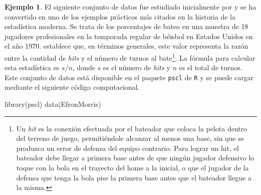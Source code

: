 \documentclass[
  10pt,
  spanish,
]{book}
\newenvironment{Shaded}{\begin{snugshade}}{\end{snugshade}}
\newcommand{\FunctionTok}[1]{\textcolor[rgb]{0.00,0.00,0.00}{#1}}
\newcommand{\NormalTok}[1]{#1}
\theoremstyle{definition}
\theoremstyle{definition}
\newtheorem{example}{Ejemplo}[chapter]
\theoremstyle{definition}
\theoremstyle{definition}
\theoremstyle{remark}
\begin{document}
\begin{example}
\protect\hypertarget{exm:unnamed-chunk-23}{}{\label{exm:unnamed-chunk-23} }El siguiente conjunto de datos fue estudiado inicialmente por \citet{Efron75} y se ha convertido en uno de los ejemplos prácticos más citados en la historia de la estadística moderna. Se trata de los porcentajes de bateo en una muestra de 18 jugadores profesionales en la temporada regular de béisbol en Estados Unidos en el año 1970. \citet{wikiBat} establece que, en términos generales, este valor representa la razón entre la cantidad de \emph{hits} y el número de turnos al bate\footnote{Un \emph{hit} es la conexión efectuada por el bateador que coloca la pelota dentro del terreno de juego, permitiéndole alcanzar al menos una base, sin que se produzca un error de defensa del equipo contrario. Para lograr un hit, el bateador debe llegar a primera base antes de que ningún jugador defensivo lo toque con la bola en el trayecto del home a la inicial, o que el jugador de la defensa que tenga la bola pise la primera base antes que el bateador llegue a la misma.}. La fórmula para calcular esta estadística es \(s/n\), donde \(s\) es el número de \emph{hits} y \(n\) es el total de turnos. Este conjunto de datos está disponible en el paquete \texttt{pscl} de \texttt{R} y se puede cargar mediante el siguiente código computacional.
\end{example}

\begin{Shaded}
\begin{Highlighting}[]
\FunctionTok{library}\NormalTok{(pscl)}
\FunctionTok{data}\NormalTok{(EfronMorris)}
\end{Highlighting}
\end{Shaded}
\end{document}
